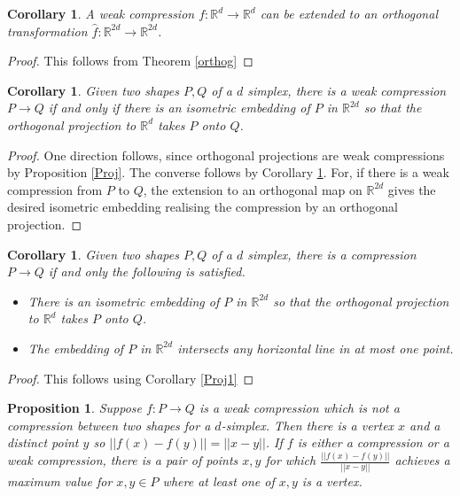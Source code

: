\documentclass[a4paper, 12pt]{amsart}
\theoremstyle{plain}
\newtheorem{Coro}[Thm]{Corollary}
\newtheorem{Prop}[Thm]{Proposition}
\begin{document}
\begin{Coro} \label{ext}
A weak compression $f: \mathbb{R}^d \to \mathbb{R}^d$ can be extended to an orthogonal transformation ${\hat f}: \mathbb{R}^{2d} \to \mathbb{R}^{2d}$.
\end{Coro}
\begin{proof} 
This follows from Theorem \ref{orthog}
\end{proof}

\begin{Coro} \label{comp}
Given two shapes $P,Q$ of a $d$ simplex, there is a weak compression $P \to Q$ if and only if there is an isometric embedding of $P$ in $\mathbb{R}^{2d}$ so that the orthogonal projection to $\mathbb{R}^{d}$ takes $P$ onto $Q$.
\end{Coro}

\begin{proof}
One direction follows, since orthogonal projections are weak compressions by Proposition \ref{Proj}. The converse follows by Corollary \ref{ext}. For, if there is a weak compression from $P$ to $Q$, the extension to an orthogonal map on $\mathbb{R}^{2d}$ gives the desired isometric embedding realising the compression by an orthogonal projection. 
\end{proof}

\begin{Coro}
Given two shapes $P,Q$ of a $d$ simplex, there is a compression $P \to Q$ if and only the following is satisfied. 

\begin{itemize}
\item There is an isometric embedding of $P$ in $\mathbb{R}^{2d}$ so that the orthogonal projection to $\mathbb{R}^{d}$ takes $P$ onto $Q$.

\item The embedding of $P$ in $\mathbb{R}^{2d}$ intersects any horizontal line in at most one point. 

\end{itemize}

\end{Coro}


\begin{proof}
This follows using Corollary \ref{Proj1}

\end{proof}




\begin{Prop}
Suppose $f:P \to Q$ is a weak compression which is not a compression between two shapes for a $d$-simplex. Then
there is a vertex $x$ and a distinct point $y$ so $||f(x)-f(y)||=||x-y||$.
If $f$ is either a compression or a weak compression, there is a pair of points $x,y$ for which $\frac{||f(x)-f(y)||}{||x-y||}$ achieves a maximum value for $x,y \in P$ where at least one of $x,y$ is a vertex. 

\end{Prop}
\end{document}
